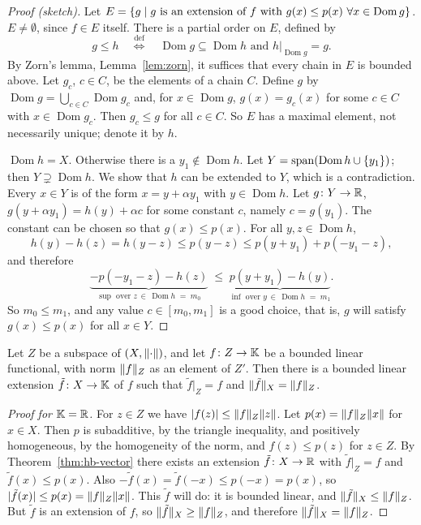 \begin{proof}[Proof (sketch)]
Let $E = \{g \mid g \text{ is an extension of } f \text{ with }
g(x) \le p(x) \ \forall x \in \operatorname{Dom} g\}$. $E \ne \emptyset$,
since $f \in E$ itself. There is a partial order on $E$, defined by
\[
  g \le h \quad \overset{\text{def}}{\iff} \quad
  \operatorname{Dom} g \subseteq \operatorname{Dom} h
  \text{ and } h|_{\operatorname{Dom} g} = g .
\]
By Zorn's lemma, Lemma~\ref{lem:zorn}, it suffices that every chain in $E$
is bounded above. Let $g_c$, $c \in C$, be the elements of a chain $C$.
Define $g$ by $\operatorname{Dom} g = \bigcup_{c \in C} \operatorname{Dom}
g_c$ and, for $x \in \operatorname{Dom} g$, $g(x) = g_c(x)$ for some
$c \in C$ with $x \in \operatorname{Dom} g_c$. Then $g_c \le g$ for all
$c \in C$. So $E$ has a maximal element, not necessarily unique; denote it
by $h$.

$\operatorname{Dom} h = X$. Otherwise there is a
$y_1 \notin \operatorname{Dom} h$. Let
$Y = \operatorname{span}(\operatorname{Dom} h \cup \{y_1\})$; then
$Y \supsetneq \operatorname{Dom} h$. We show that $h$ can be extended to
$Y$, which is a contradiction. Every $x \in Y$ is of the form
$x = y + \alpha y_1$ with $y \in \operatorname{Dom} h$. Let
$g \colon Y \to \mathbb{R}$, $g(y + \alpha y_1) = h(y) + \alpha c$ for some constant
$c$, namely $c = g(y_1)$. The constant can be chosen so that
$g(x) \le p(x)$. For all $y, z \in \operatorname{Dom} h$,
\[
  h(y) - h(z) = h(y - z) \le p(y - z) \le p(y + y_1) + p(-y_1 - z) ,
\]
and therefore
\[
  \underbrace{-p(-y_1 - z) - h(z)}_{\sup \text{ over } z \,\in\,
    \operatorname{Dom} h \;=\; m_0}
  \;\le\;
  \underbrace{p(y + y_1) - h(y)}_{\inf \text{ over } y \,\in\,
    \operatorname{Dom} h \;=\; m_1} .
\]
So $m_0 \le m_1$, and any value $c \in [m_0, m_1]$ is a good choice, that
is, $g$ will satisfy $g(x) \le p(x)$ for all $x \in Y$.
\end{proof}

\begin{theorem}\label{thm:hb-normed}
Let $Z$ be a subspace of $(X, \lVert\cdot\rVert)$, and let $f \colon Z \to \mathbb{K}$
be a bounded linear functional, with norm $\lVert f\rVert_Z$ as an element
of $Z'$.
Then there is a bounded linear extension $\tilde{f} \colon X \to \mathbb{K}$ of $f$
such that $\tilde{f}|_Z = f$ and $\lVert\tilde{f}\rVert_X = \lVert f\rVert_Z$.
\end{theorem}

\begin{proof}[Proof for $\mathbb{K} = \mathbb{R}$]
For $z \in Z$ we have $\lvert f(z)\rvert \le \lVert f\rVert_Z \lVert z\rVert$. Let
$p(x) = \lVert f\rVert_Z \lVert x\rVert$ for $x \in X$. Then $p$ is subadditive, by the
triangle inequality, and positively homogeneous, by the homogeneity of the
norm, and $f(z) \le p(z)$ for $z \in Z$. By
Theorem~\ref{thm:hb-vector} there exists an extension
$\tilde{f} \colon X \to \mathbb{R}$ with $\tilde{f}|_Z = f$ and
$\tilde{f}(x) \le p(x)$. Also
$-\tilde{f}(x) = \tilde{f}(-x) \le p(-x) = p(x)$, so
$\lvert\tilde{f}(x)\rvert \le p(x) = \lVert f\rVert_Z \lVert x\rVert$. This $\tilde{f}$ will
do: it is bounded linear, and $\lVert\tilde{f}\rVert_X \le \lVert f\rVert_Z$. But
$\tilde{f}$ is an extension of $f$, so $\lVert\tilde{f}\rVert_X \ge \lVert f\rVert_Z$,
and therefore $\lVert\tilde{f}\rVert_X = \lVert f\rVert_Z$.
\end{proof}

